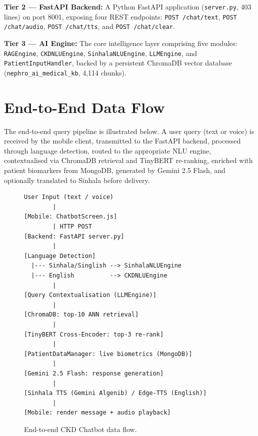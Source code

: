 \documentclass[12pt,a4paper]{report}
\begin{document}
\textbf{Tier 2 --- FastAPI Backend:} A Python FastAPI application (\texttt{server.py}, 403 lines) on port 8001, exposing four REST endpoints: \texttt{POST /chat/text}, \texttt{POST /chat/audio}, \texttt{POST /chat/tts}, and \texttt{POST /chat/clear}.

\textbf{Tier 3 --- AI Engine:} The core intelligence layer comprising five modules: \texttt{RAGEngine}, \texttt{CKDNLUEngine}, \texttt{SinhalaNLUEngine}, \texttt{LLMEngine}, and \texttt{PatientInputHandler}, backed by a persistent ChromaDB vector database (\texttt{nephro\_ai\_medical\_kb}, 4,114 chunks).

\section{End-to-End Data Flow}

The end-to-end query pipeline is illustrated below. A user query (text or voice) is received by the mobile client, transmitted to the FastAPI backend, processed through language detection, routed to the appropriate NLU engine, contextualised via ChromaDB retrieval and TinyBERT re-ranking, enriched with patient biomarkers from MongoDB, generated by Gemini 2.5 Flash, and optionally translated to Sinhala before delivery.

\begin{figure}[H]
\centering
\begin{mdframed}
\small
\begin{verbatim}
User Input (text / voice)
        |
[Mobile: ChatbotScreen.js]
        | HTTP POST
[Backend: FastAPI server.py]
        |
[Language Detection]
  |--- Sinhala/Singlish --> SinhalaNLUEngine
  |--- English          --> CKDNLUEngine
        |
[Query Contextualisation (LLMEngine)]
        |
[ChromaDB: top-10 ANN retrieval]
        |
[TinyBERT Cross-Encoder: top-3 re-rank]
        |
[PatientDataManager: live biometrics (MongoDB)]
        |
[Gemini 2.5 Flash: response generation]
        |
[Sinhala TTS (Gemini Algenib) / Edge-TTS (English)]
        |
[Mobile: render message + audio playback]
\end{verbatim}
\end{mdframed}
\caption{End-to-end CKD Chatbot data flow.}
\label{fig:dataflow}
\end{figure}
\end{document}
